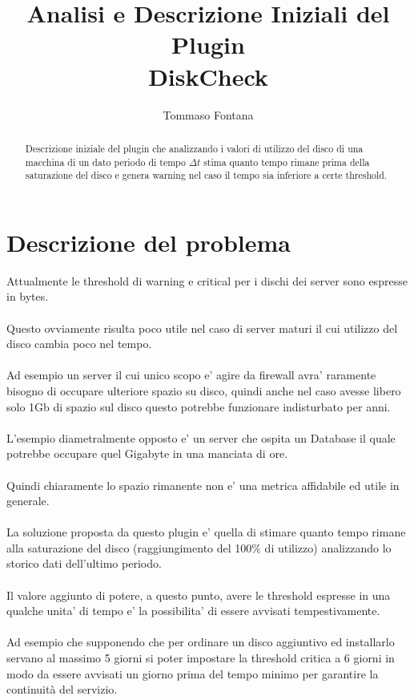 \documentclass{article}
\title{Analisi e Descrizione Iniziali del Plugin \\ \textbf{DiskCheck \version}}
\author{Tommaso Fontana}
\begin{document}
\maketitle

\begin{abstract}
Descrizione iniziale del plugin che analizzando i valori di utilizzo del disco di una macchina di un dato periodo di tempo \(\Delta t\) stima quanto tempo rimane prima della saturazione del disco e genera warning nel caso il tempo sia inferiore a certe threshold.
\end{abstract}

\clearpage
\part*{Descrizione del problema}
Attualmente le threshold di warning e critical per i dischi dei server sono espresse in bytes.
\\\\
Questo ovviamente risulta poco utile nel caso di server maturi il cui utilizzo del disco cambia poco nel tempo.
\\\\
Ad esempio un server il cui unico scopo e' agire da firewall avra' raramente bisogno di occupare ulteriore spazio su disco, quindi anche nel caso avesse libero solo 1Gb di spazio sul disco questo potrebbe funzionare indisturbato per anni.
\\\\
L'esempio diametralmente opposto e' un server che ospita un Database il quale potrebbe occupare quel Gigabyte in una manciata di ore.
\\\\
Quindi chiaramente lo spazio rimanente non e' una metrica affidabile ed utile in generale.
\\\\
La soluzione proposta da questo plugin e' quella di stimare quanto tempo rimane alla saturazione del disco (raggiungimento del 100\% di utilizzo) analizzando lo storico dati dell'ultimo periodo.
\\\\
Il valore aggiunto di potere, a questo punto, avere le threshold espresse in una qualche unita' di tempo e' la possibilita' di essere avvisati tempestivamente.
\\\\
Ad esempio che supponendo che per ordinare un disco aggiuntivo ed installarlo servano al massimo 5 giorni si poter impostare la threshold critica a 6 giorni in modo da essere avvisati un giorno prima del tempo minimo per garantire la continuità del servizio.
\end{document}
